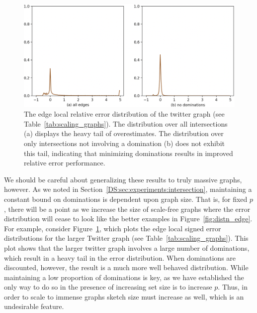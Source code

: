 \documentclass[10]{report}
\begin{document}
\begin{figure}
	\centerline{\includegraphics[width=0.8\columnwidth]{dist_twitter}}
	\caption{The edge local relative error distribution of the twitter graph (see Table~\ref{tab:scaling_graphs}).
	The distribution over all intersections (a) displays the heavy tail of overestimates.
	The distribution over only intersections not involving a domination (b) does not exhibit this tail, indicating that minimizing dominations results in improved relative error performance.
	\label{fig:dist_twitter}}
\end{figure}


We should be careful about generalizing these results to truly massive graphs, however.
As we noted in Section~\ref{DS:sec:experiments:intersection}, maintaining a constant bound on dominations is dependent upon graph size. 
That is, for fixed $p$, there will be a point as we increase the size of scale-free graphs where the error distribution will cease to look like the better examples in Figure~\ref{fig:distn_edge}. 
For example, consider Figure~\ref{fig:dist_twitter}, which plots the edge local signed error distributions for the larger Twitter graph (see Table~\ref{tab:scaling_graphs}).
This plot shows that the larger twitter graph involves a large number of dominations, which result in a heavy tail in the error distribution. 
When dominations are discounted, however, the result is a much more well behaved distribution.
While maintaining a low proportion of dominations is key, as we have established the only way to do so in the presence of increasing set size is to increase $p$.
Thus, in order to scale to immense graphs sketch size must increase as well, which is an undesirable feature. 
\end{document}
